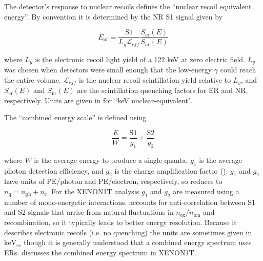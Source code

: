 The detector's response to nuclear recoils defines the ``nuclear recoil equivalent energy''.  By convention it is determined by the NR S1
signal given by

\begin{equation}
E_{\mathrm{nr}} = \frac{\mathrm{S1}}{L_{y} \mathcal{L}_{eff}} \frac{S_{\mathrm{er}}(E)}{S_{\mathrm{nr}}(E)}
\label{eq:tpcs_signals_energy_energy_nr}
\end{equation}

\noindent where $L_{y}$ is the electronic recoil light yield of a 122 keV \gammaray at zero electric
field.  $L_{y}$ was chosen when detectors were small enough that the low-energy  $\gamma$ could reach the
entire volume.  $\mathcal{L}_{eff}$ is the nuclear recoil
scintillation yield relative to $L_{y}$, and $S_{\mathrm{er}}(E)$ and $S_{\mathrm{nr}}(E)$ are the scintillation quenching factors for ER
and NR, respectively.  Units are given in \kevnr for ``keV nuclear-equivalent".

The ``combined energy scale'' is defined using

\begin{equation}
\frac{E}{W} = \frac{\mathrm{S1}}{g_1} + \frac{\mathrm{S2}}{g_2}
\label{eq:tpcs_signals_energy_ces}
\end{equation}

\noindent where $W$ is the average energy to produce a single quanta, $g_1$ is the average photon detection efficiency, and $g_2$ is the
charge amplification factor ().  $g_1$ and $g_2$ have units of
PE/photon and PE/electron, respectively, so  reduces to
$n_{\mathrm{q}} = n_{\mathrm{ph}} + n_{\mathrm{e}}$.  For the XENON1T analysis $g_1$ and $g_2$ are measured using a
number of mono-energetic interactions.   accounts for
anti-correlation between S1 and S2 signals that arrise from natural fluctuations in $n_{\mathrm{ex}}/n_{\mathrm{ion}}$ and recombination,
so it typically leads to better energy resolution.  Because it describes electronic recoils (i.e. no quenching) the units are
sometimes given in $\mathrm{keV_{ee}}$ though it is generally understood that a combined energy spectrum uses
ERs.   discusses the combined energy spectrum in XENON1T.






















